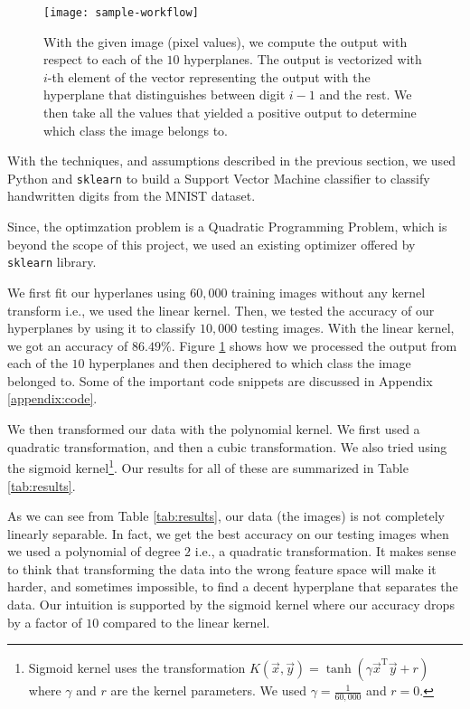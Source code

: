 
\begin{figure}[!tb]
	\texttt{[image: sample-workflow]}
	\centering
	\caption{With the given image (pixel values), we compute the output with respect to each of the $10$ hyperplanes. The output is vectorized with $i$-th element of the vector representing the output with the hyperplane that distinguishes between digit $i-1$ and the rest. We then take all the values that yielded a positive output to determine which class the image belongs to.}
	\label{fig:workflow}
\end{figure}

With the techniques, and assumptions described in the previous section, we used Python and \texttt{sklearn} to build a Support Vector Machine classifier to classify handwritten digits from the MNIST dataset.

Since, the optimzation problem is a Quadratic Programming Problem, which is beyond the scope of this project, we used an existing optimizer offered by \texttt{sklearn} library.

We first fit our hyperlanes using $60,000$ training images without any kernel transform i.e., we used the linear kernel. Then, we tested the accuracy of our hyperplanes by using it to classify $10,000$ testing images. With the linear kernel, we got an accuracy of $86.49 \%$. Figure \ref{fig:workflow} shows how we processed the output from each of the $10$ hyperplanes and then deciphered to which class the image belonged to. Some of the important code snippets are discussed in Appendix \ref{appendix:code}.

We then transformed our data with the polynomial kernel. We first used a quadratic transformation, and then a cubic transformation. We also tried using the sigmoid kernel\footnote{Sigmoid kernel uses the transformation $K(\vec{x}, \vec{y}) = \tanh(\gamma\vec{x}^{\text{T}}\vec{y} + r)$ where $\gamma$ and $r$ are the kernel parameters. We used $\gamma=\frac{1}{60,000}$ and $r=0$.}. Our results for all of these are summarized in Table \ref{tab:results}.

As we can see from Table \ref{tab:results}, our data (the images) is not completely linearly separable. In fact, we get the best accuracy on our testing images when we used a polynomial of degree $2$ i.e., a quadratic transformation. It makes sense to think that transforming the data into the wrong feature space will make it harder, and sometimes impossible, to find a decent hyperplane that separates the data. Our intuition is supported by the sigmoid kernel where our accuracy drops by a factor of $10$ compared to the linear kernel.

